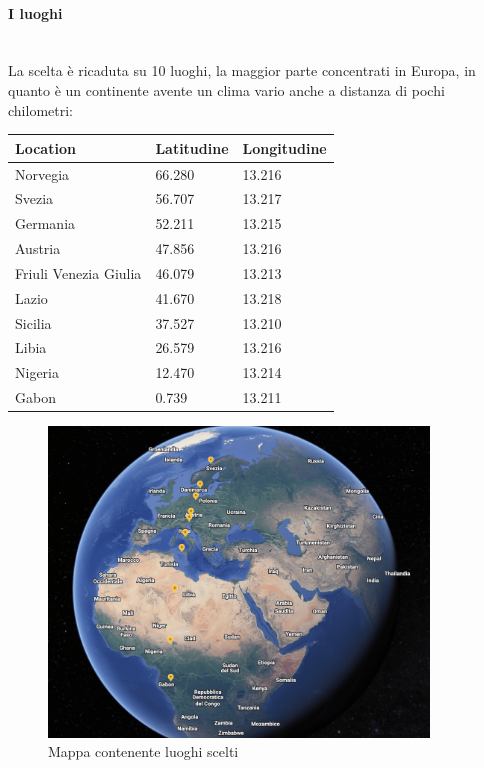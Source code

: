 \paragraph{I luoghi}\mbox{}\\
La scelta è ricaduta su 10 luoghi, la maggior parte concentrati in Europa, in quanto è un continente avente un clima vario anche a distanza di pochi chilometri:
\begin{table}[ht]
    \centering
    \begin{tabular}{|lll|}
    \hline
        \textbf{Location} & \textbf{Latitudine} & \textbf{Longitudine} \\ \hline
        Norvegia & 66.280 & 13.216 \\ \hline
        Svezia & 56.707 & 13.217 \\ \hline
        Germania & 52.211 & 13.215 \\ \hline
        Austria & 47.856 & 13.216 \\ \hline
        Friuli Venezia Giulia & 46.079 & 13.213 \\ \hline
        Lazio & 41.670 & 13.218 \\ \hline
        Sicilia & 37.527 & 13.210 \\ \hline
        Libia & 26.579 & 13.216 \\ \hline
        Nigeria & 12.470 & 13.214 \\ \hline
        Gabon & 0.739 & 13.211 \\ \hline
    \end{tabular}
    \label{tab:coordinate}
\end{table}
\begin{figure}[H]
    \centering
    \includegraphics[width=0.9\textwidth]{res/cap 5/map.png}
    \caption{Mappa contenente luoghi scelti}
    \label{img:Mappa luoghi}
\end{figure}\noindent

